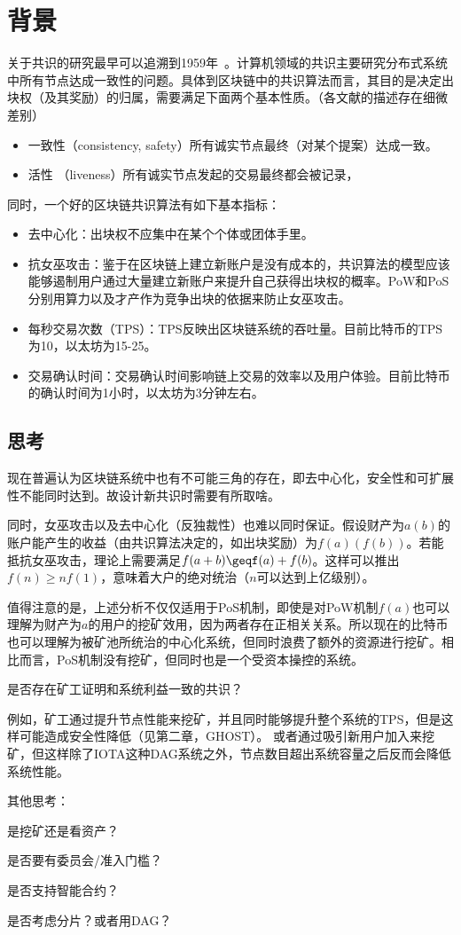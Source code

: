 \section{背景}
关于共识的研究最早可以追溯到1959年~\cite{eisenberg1959consensus}。计算机领域的共识主要研究分布式系统中所有节点达成一致性的问题。具体到区块链中的共识算法而言，其目的是决定出块权（及其奖励）的归属，需要满足下面两个基本性质。（各文献的描述存在细微差别）

\begin{itemize}
\item 一致性（consistency, safety）所有诚实节点最终（对某个提案）达成一致。
\item 活性 （liveness）所有诚实节点发起的交易最终都会被记录，
\end{itemize}
同时，一个好的区块链共识算法有如下基本指标：
\begin{itemize}
\item 去中心化：出块权不应集中在某个个体或团体手里。
\item 抗女巫攻击：鉴于在区块链上建立新账户是没有成本的，共识算法的模型应该能够遏制用户通过大量建立新账户来提升自己获得出块权的概率。PoW和PoS分别用算力以及才产作为竞争出块的依据来防止女巫攻击。
\item 每秒交易次数（TPS）：TPS反映出区块链系统的吞吐量。目前比特币的TPS为10，以太坊为15-25。
\item 交易确认时间：交易确认时间影响链上交易的效率以及用户体验。目前比特币的确认时间为1小时，以太坊为3分钟左右。
\end{itemize}

\subsection{思考}
现在普遍认为区块链系统中也有不可能三角的存在，即去中心化，安全性和可扩展性不能同时达到。故设计新共识时需要有所取啥。

同时，女巫攻击以及去中心化（反独裁性）也难以同时保证。假设财产为$a(b)$的账户能产生的收益（由共识算法决定的，如出块奖励）为$f(a)(f(b))$。若能抵抗女巫攻击，理论上需要满足$f(a+b)\geqf(a)+f(b)$。这样可以推出$f(n)\geq nf(1)$，意味着大户的绝对统治（$n$可以达到上亿级别）。

值得注意的是，上述分析不仅仅适用于PoS机制，即使是对PoW机制$f(a)$也可以理解为财产为$a$的用户的挖矿效用，因为两者存在正相关关系。所以现在的比特币也可以理解为被矿池所统治的中心化系统，但同时浪费了额外的资源进行挖矿。相比而言，PoS机制没有挖矿，但同时也是一个受资本操控的系统。

{\color{red}是否存在矿工证明和系统利益一致的共识？}

例如，矿工通过提升节点性能来挖矿，并且同时能够提升整个系统的TPS，但是这样可能造成安全性降低（见第二章，GHOST）。 或者通过吸引新用户加入来挖矿，但这样除了IOTA这种DAG系统之外，节点数目超出系统容量之后反而会降低系统性能。

其他思考：

是挖矿还是看资产？

是否要有委员会/准入门槛？

是否支持智能合约？

是否考虑分片？或者用DAG？


